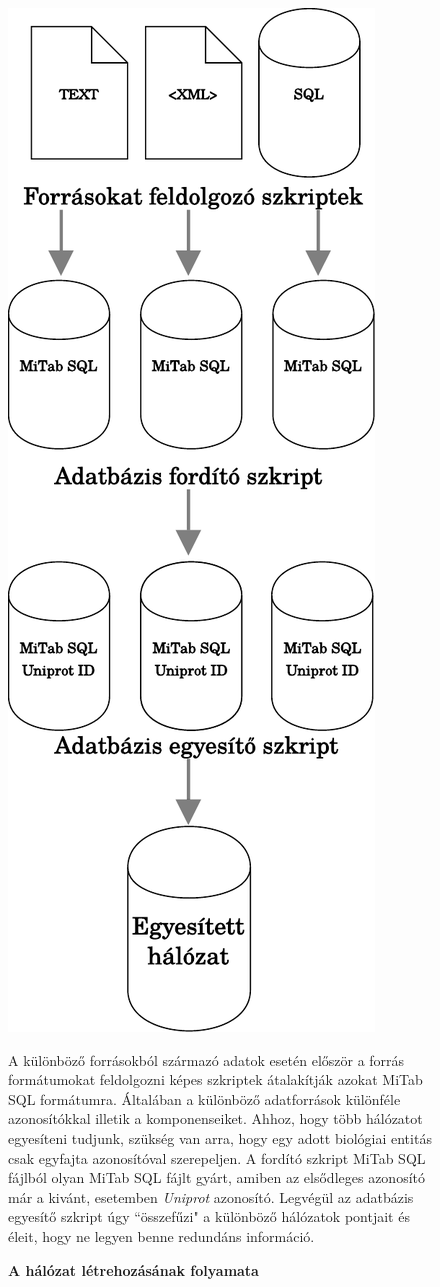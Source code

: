 \documentclass[a4paper,12pt]{article}
\begin{document}
			 	 \begin{figure}[H]
			 		 \includegraphics[scale=0.7]{img/Signalink_Layer0.pdf}
			 		 \centering
			 		 \caption{ \textbf{A hálózat létrehozásának folyamata} }
			 		 A különböző forrásokból származó adatok esetén először a forrás formátumokat feldolgozni képes szkriptek átalakítják azokat MiTab SQL formátumra. Általában a különböző adatforrások különféle azonosítókkal illetik a komponenseiket. Ahhoz, hogy több hálózatot egyesíteni tudjunk, szükség van arra, hogy egy adott biológiai entitás csak egyfajta azonosítóval szerepeljen. A fordító szkript MiTab SQL fájlból olyan MiTab SQL fájlt gyárt, amiben az elsődleges azonosító már a kivánt, esetemben \textit{Uniprot} azonosító. Legvégül az adatbázis egyesítő szkript úgy ``összefűzi" a különböző hálózatok pontjait és éleit, hogy ne legyen benne redundáns információ.
			 		 \label{fig:slk3uml}			 		 
			 	 \end{figure}
\end{document}
